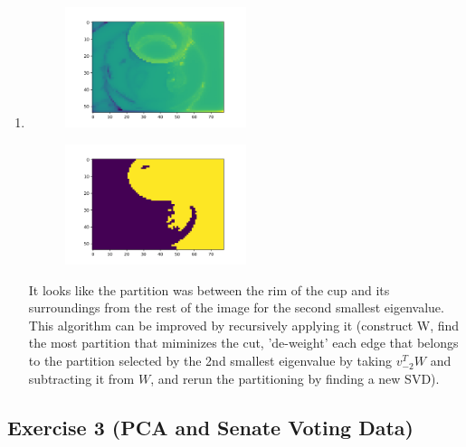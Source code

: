 \documentclass[11pt]{article}
\begin{document}
\begin{solution}
\begin{enumerate}
\item
\begin{figure}[H]
    \centerline{\includegraphics[width=0.5\textwidth]{figs/heatmap_eig2.png}}
\end{figure}

\begin{figure}[H]
    \centerline{\includegraphics[width=0.5\textwidth]{figs/binary_eig2.png}}
\end{figure}

It looks like the partition was between the rim of the cup and its surroundings from the rest of the image for the second smallest eigenvalue. This algorithm can be improved by recursively applying it (construct W, find the most partition that miminizes the cut, 'de-weight' each edge that belongs to the partition selected by the 2nd smallest eigenvalue by taking $v_{-2}^T W$ and subtracting it from $W$, and rerun the partitioning by finding a new SVD).
\end{enumerate}
\end{solution}


\newpage
\subsection*{Exercise 3 (PCA and Senate Voting Data)}
\end{document}
